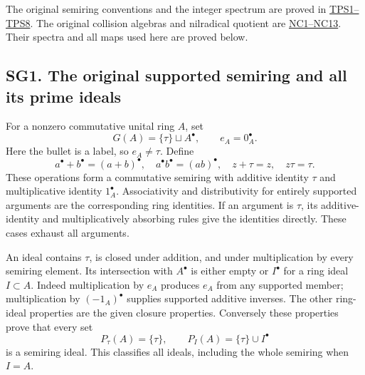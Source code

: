 \documentclass[
  10pt,
  a4paper,
]{article}
\begin{document}
The original semiring conventions and the integer spectrum are proved in
\href{https://github.com/KokunoYumeto/zeta-function-research-reader/blob/5a89872598df0902b7c1393cf8e4692ca3010a95/workbenches/splitzero-tandem/branches/tau-zero-prime-positivity/supporting_proofs/TAU_PRIME_SPECTRUM_DERIVATION.md}{TPS1--TPS8}.
The original collision algebras and nilradical quotient are
\href{https://github.com/KokunoYumeto/zeta-function-research-reader/blob/5a89872598df0902b7c1393cf8e4692ca3010a95/workbenches/splitzero-tandem/branches/tau-zero-prime-positivity/research_calculations/NILRADICAL_COTANGENT_DIVIDED_RESIDUE_DERIVATION.md}{NC1--NC13}.
Their spectra and all maps used here are proved below.

\subsection{SG1. The original supported semiring and all its prime
ideals}\label{sg1.-the-original-supported-semiring-and-all-its-prime-ideals}

For a nonzero commutative unital ring \(A\), set \[
G(A)=\{\tau\}\sqcup A^\bullet,\qquad e_A=0_A^\bullet.
\tag{SG1}
\] Here the bullet is a label, so \(e_A\ne\tau\). Define \[
a^\bullet+b^\bullet=(a+b)^\bullet,\quad
a^\bullet b^\bullet=(ab)^\bullet,\quad
z+\tau=z,\quad z\tau=\tau.
\tag{SG2}
\] These operations form a commutative semiring with additive identity
\(\tau\) and multiplicative identity \(1_A^\bullet\). Associativity and
distributivity for entirely supported arguments are the corresponding
ring identities. If an argument is \(\tau\), its additive-identity and
multiplicatively absorbing rules give the identities directly. These
cases exhaust all arguments.

An ideal contains \(\tau\), is closed under addition, and under
multiplication by every semiring element. Its intersection with
\(A^\bullet\) is either empty or \(I^\bullet\) for a ring ideal
\(I\subset A\). Indeed multiplication by \(e_A\) produces \(e_A\) from
any supported member; multiplication by \((-1_A)^\bullet\) supplies
supported additive inverses. The other ring-ideal properties are the
given closure properties. Conversely these properties prove that every
set \[
P_\tau(A)=\{\tau\},\qquad
P_I(A)=\{\tau\}\cup I^\bullet
\tag{SG3}
\] is a semiring ideal. This classifies all ideals, including the whole
semiring when \(I=A\).
\end{document}
